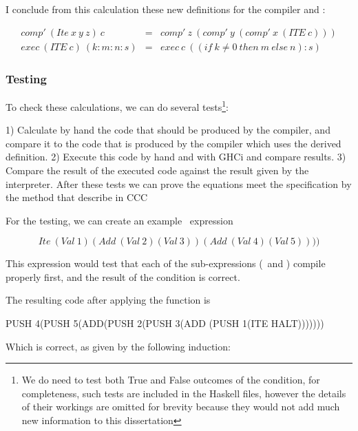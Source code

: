\documentclass {article}
\begin{document}
I conclude from this calculation these new definitions
for the compiler and \vm: 

\begin{eqnarray*}
	comp' \ (Ite \ x \ y \ z) \ c &=&  comp' \ z \ (comp' \ y \ (comp' \ x \ (ITE \ c))) \\
	exec \ (ITE \ c) \ (k:m:n:s) &=& exec \ c \ ((if \ k \not= 0 \ then \ m \ else \ n):s)
\end{eqnarray*}

\subsubsection{Testing}

To check these calculations, we can do several tests\footnote{
We do need to test both True and False outcomes of the condition,
for completeness, such tests are included in the Haskell
files, however the details of their workings are omitted
for brevity because they would not add much new
information to this dissertation}:

1) Calculate by hand the code that should be produced by the compiler, and compare
it to the code that is produced by the compiler which uses the derived definition.
2) Execute this code by hand and with GHCi and compare results.
3) Compare the result of the executed code against the result
given by the interpreter.
After these tests we can prove the equations meet the specification
by the method that \BH describe in CCC \cite[page 14; derivation vs proof]{bandh}

For the testing, we can create an example \ite\ expression

	\[Ite \ (Val \ 1) (Add \ (Val \ 2) (Val \ 3)) (Add \ (Val \ 4) (Val \ 5)))) \]

This expression would test that
each of the sub-expressions (\add\ and \val) compile properly first, 
and the result of the condition is correct.

The resulting code after applying the \comp function is

	PUSH 4(PUSH 5(ADD(PUSH 2(PUSH 3(ADD (PUSH 1(ITE HALT)))))))

Which is correct, as given by the following induction:
\end{document}
